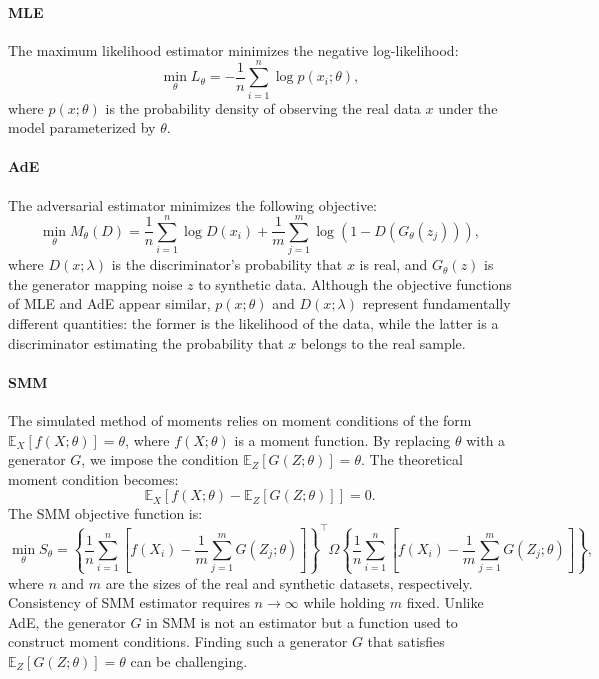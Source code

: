 \documentclass[12pt]{article}
\begin{document}
\paragraph{MLE}
The maximum likelihood estimator minimizes the negative log-likelihood:
\begin{equation*}
    \min_\theta L_\theta = -\frac{1}{n} \sum_{i=1}^n \log p(x_i; \theta),
\end{equation*}
where \(p(x; \theta)\) is the probability density of observing the real data \(x\) under the model parameterized by \(\theta\).

\paragraph{AdE}
The adversarial estimator minimizes the following objective:
\begin{equation*}
    \min_\theta M_\theta(D) = \frac{1}{n} \sum_{i=1}^n \log D(x_i) + \frac{1}{m} \sum_{j=1}^m \log \left(1 - D(G_\theta(z_j))\right),
\end{equation*}
where \(D(x; \lambda)\) is the discriminator's probability that \(x\) is real, and \(G_\theta(z)\) is the generator mapping noise \(z\) to synthetic data. Although the objective functions of MLE and AdE appear similar, \(p(x; \theta)\) and \(D(x; \lambda)\) represent fundamentally different quantities: the former is the likelihood of the data, while the latter is a discriminator estimating the probability that \(x\) belongs to the real sample.

\paragraph{SMM}
The simulated method of moments relies on moment conditions of the form
\(\mathbb{E}_X[f(X; \theta)] = \theta\), where \(f(X; \theta)\) is a moment
function. By replacing \(\theta\) with a generator \(G\), we impose the
condition \(\mathbb{E}_Z[G(Z; \theta)] = \theta\). The theoretical moment
condition becomes:
\begin{equation*}
    \mathbb{E}_X\left[f(X; \theta) - \mathbb{E}_Z[G(Z; \theta)]\right] = 0.
\end{equation*}
The SMM objective function is:
\begin{equation*}
    \min_\theta S_\theta = \left\{\frac{1}{n}\sum_{i=1}^n \left[f(X_i) - \frac{1}{m} \sum_{j=1}^m G(Z_j; \theta)\right]\right\}^\top \Omega \left\{\frac{1}{n}\sum_{i=1}^n \left[f(X_i) - \frac{1}{m} \sum_{j=1}^m G(Z_j; \theta)\right]\right\},
\end{equation*}
where \(n\) and \(m\) are the sizes of the real and synthetic datasets, respectively. Consistency of SMM estimator requires $n\to\infty$ while holding $m$ fixed. Unlike AdE, the generator \(G\) in SMM is not an estimator but a function used to construct moment conditions. Finding such a generator \(G\) that satisfies \(\mathbb{E}_Z[G(Z; \theta)] = \theta\) can be challenging.
\end{document}
